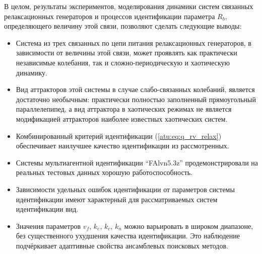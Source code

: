 В целом, результаты экспериментов,
моделирования динамики систем связанных релаксационных генераторов
и процессов идентификации параметра $R_b$, определяющего величину этой связи,
позволяют сделать следующие выводы:

\begin{itemize}

  \item
    Система из трех связанных по цепи питания релаксационных генераторов,
    в зависимости от величины этой связи, может
    проявлять как практически независимые колебания,
    так и сложно-периодическую и хаотическую динамику.


  \item
    Вид аттракторов этой системы в случае слабо-связанных колебаний,
    является достаточно необычным: практически полностью заполненный
    прямоугольный параллелепипед,
    а вид аттрактора в хаотических режимах не является
    модификацией аттракторов наиболее известных хаотических систем.


  \item
    Комбинированный критерий идентификации (\ref{atu:eq:q_rv_relax})
    обеспечивает наилучшее качество идентификации из рассмотренных.

  \item
    Системы мультиагентной идентификации ``FAlvn5.3z''
    продемонстрировали на реальных тестовых данных
    хорошую работоспособность.

  \item
    Зависимости удельных ошибок идентификации от параметров системы идентификации
    имеют характерный для рассматриваемых систем идентификации вид.

  \item
    Значения параметров $v_f$, $k_e$, $k_c$, $k_n$
    можно варьировать в широком диапазоне, без существенного
    ухудшения качества идентификации. Это наблюдение подчёркивает
    адаптивные свойства ансамблевых поисковых методов.

\end{itemize}




